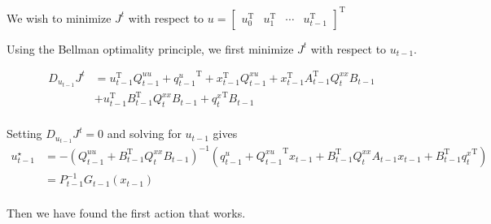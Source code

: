 \documentclass{article}
\begin{document}
We wish to minimize $J^t$ with respect to $u = \begin{bmatrix}
		u_0^\mathrm{T} &
		u_1^\mathrm{T} &
		\cdots         &
		u_{t-1}^\mathrm{T}
	\end{bmatrix}^\mathrm{T} $

Using the Bellman optimality principle, we first minimize $J^t$ with respect to $u_{t-1}$.

\begin{align*}
	D_{u_{t-1}} J^t & = u_{t-1}^\mathrm{T} Q_{t-1}^{uu} + {q_{t-1}^u}^\mathrm{T} + x_{t-1}^\mathrm{T} Q_{t-1}^{xu} + x_{t-1}^\mathrm{T} A_{t-1}^\mathrm{T} Q_t^{xx} B_{t-1} \\
	                & + u_{t-1}^\mathrm{T} B_{t-1}^\mathrm{T} Q_t^{xx} B_{t-1} + {q_t^x}^\mathrm{T} B_{t-1}                                                                 \\
\end{align*}

Setting $D_{u_{t-1}} J^t = 0$ and solving for $u_{t-1}$ gives
\begin{align*}
	u_{t-1}^\star & = -\left(Q_{t-1}^{uu} + B_{t-1}^\mathrm{T} Q_t^{xx} B_{t-1} \right)^{-1} \left( q_{t-1}^u + {Q_{t-1}^{xu}}^\mathrm{T} x_{t-1} + B_{t-1}^\mathrm{T} Q_t^{xx} A_{t-1} x_{t-1} + B_{t-1}^\mathrm{T} {q_t^x}^\mathrm{T} \right) \\
	              & = P_{t-1}^\mathrm{-1} G_{t-1}(x_{t-1})                                                                                                                                                                                      \\
\end{align*}

Then we have found the first action that works.
\end{document}
